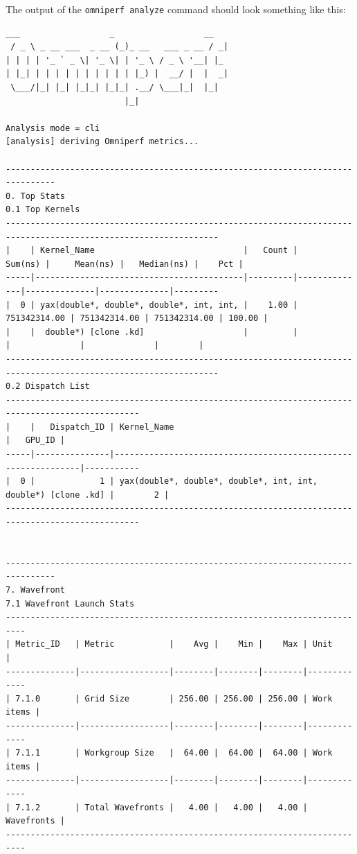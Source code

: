 \documentclass[
]{article}
\let\oldtexttt\texttt
\renewcommand{\texttt}[1]{
  \colorbox{Light}{\oldtexttt{#1}}
}
\begin{document}
The output of the \texttt{omniperf\ analyze} command should look
something like this:

\begin{Verbatim}[fontsize=\footnotesize] 
  ___                  _                  __
 / _ \ _ __ ___  _ __ (_)_ __   ___ _ __ / _|
| | | | '_ ` _ \| '_ \| | '_ \ / _ \ '__| |_
| |_| | | | | | | | | | | |_) |  __/ |  |  _|
 \___/|_| |_| |_|_| |_|_| .__/ \___|_|  |_|
                        |_|

Analysis mode = cli
[analysis] deriving Omniperf metrics...
                                                                                                                                                                                                                --------------------------------------------------------------------------------
0. Top Stats
0.1 Top Kernels
-----------------------------------------------------------------------------------------------------------------
|    | Kernel_Name                              |   Count |      Sum(ns) |     Mean(ns) |   Median(ns) |    Pct |
-----|------------------------------------------|---------|--------------|--------------|--------------|---------
|  0 | yax(double*, double*, double*, int, int, |    1.00 | 751342314.00 | 751342314.00 | 751342314.00 | 100.00 |
|    |  double*) [clone .kd]                    |         |              |              |              |        |
-----------------------------------------------------------------------------------------------------------------                                                                                               0.2 Dispatch List
-------------------------------------------------------------------------------------------------
|    |   Dispatch_ID | Kernel_Name                                                   |   GPU_ID |
-----|---------------|---------------------------------------------------------------|-----------
|  0 |             1 | yax(double*, double*, double*, int, int, double*) [clone .kd] |        2 |
-------------------------------------------------------------------------------------------------

                                                                                                                                                                                                                --------------------------------------------------------------------------------
7. Wavefront
7.1 Wavefront Launch Stats
--------------------------------------------------------------------------
| Metric_ID   | Metric           |    Avg |    Min |    Max | Unit       |
--------------|------------------|--------|--------|--------|-------------
| 7.1.0       | Grid Size        | 256.00 | 256.00 | 256.00 | Work items |
--------------|------------------|--------|--------|--------|-------------
| 7.1.1       | Workgroup Size   |  64.00 |  64.00 |  64.00 | Work items |
--------------|------------------|--------|--------|--------|-------------
| 7.1.2       | Total Wavefronts |   4.00 |   4.00 |   4.00 | Wavefronts |
--------------------------------------------------------------------------
\end{Verbatim}
\end{document}
